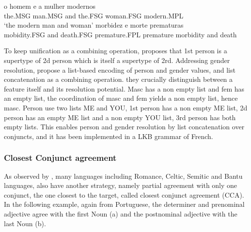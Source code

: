 \documentclass[output=paper]{langsci/langscibook}
\begin{document}
\begin{exe}
 \ex
\begin{xlista}
\ex o homem e a mulher modernos \\
the.MSG man.MSG and the.FSG woman.FSG modern.MPL \\
‘the modern man and woman’ 
\ex morbidez e morte prematuras \\
mobidity.FSG and death.FSG premature.FPL
premature morbidity and death\\
\citep[433]{Villavicencio:Sadler:ea:05}
\end{xlista}\label{pt}
\end{exe}

To keep unification as a combining operation, \citet{Sag:03} proposes that 1st person is a supertype of 2d person which is itself a supertype of 2rd. Addressing gender resolution, \citet{Aguila:Crysmann:18} propose a list-based encoding of person and gender values, and list concatenation as a combining operation. they crucially distinguish between a feature itself and its resolution potential. Masc has a non empty list and fem has an empty list, the coordination of masc and fem yields a non empty list, hence masc. Person use two lists ME and YOU, 1st person has a non empty ME list, 2d person has an empty ME list and a non empty YOU list, 3rd person has both empty lists. This enables person and gender resolution by list concatenation over conjuncts, and it has been implemented in a LKB grammar of French.

\subsubsection{Closest Conjunct agreement}

%

As observed by \citet{Corbet91}, many languages including Romance, Celtic, Semitic and Bantu languages, also have another strategy, namely partial agreement with only one conjunct, the one closest to the target, called closest conjunct agreement (CCA). 
In the following example, again from Portuguese, the determiner and prenominal adjective agree with the first Noun (a) and the postnominal adjective with the last Noun (b).
\end{document}
